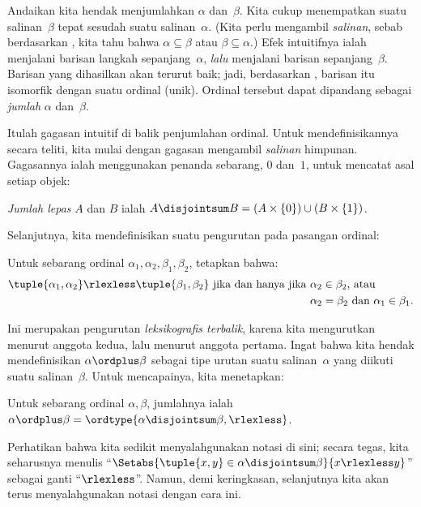 \documentclass[../../../include/open-logic-section]{subfiles}
\begin{document}

Andaikan kita hendak menjumlahkan $\alpha$ dan~$\beta$. Kita cukup
menempatkan suatu salinan~$\beta$ tepat sesudah suatu salinan~$\alpha$.
(Kita perlu mengambil \emph{salinan}, sebab berdasarkan
, kita tahu bahwa
$\alpha\subseteq\beta$ atau $\beta\subseteq\alpha$.) Efek intuitifnya ialah
menjalani barisan langkah sepanjang~$\alpha$, \emph{lalu} menjalani barisan
sepanjang~$\beta$. Barisan yang dihasilkan akan terurut baik; jadi, berdasarkan
, barisan itu isomorfik
dengan suatu ordinal (unik). Ordinal tersebut dapat dipandang sebagai
\emph{jumlah} $\alpha$ dan~$\beta$.

Itulah gagasan intuitif di balik penjumlahan ordinal. Untuk mendefinisikannya
secara teliti, kita mulai dengan gagasan mengambil \emph{salinan} himpunan.
Gagasannya ialah menggunakan penanda sebarang, $0$ dan~$1$, untuk mencatat
asal setiap objek:

\begin{defn}
\emph{Jumlah lepas} $A$ dan $B$ ialah
$A\disjointsum B=(A\times\{0\})\cup(B\times\{1\})$.
\end{defn}

Selanjutnya, kita mendefinisikan suatu pengurutan pada pasangan ordinal:

\begin{defn}
Untuk sebarang ordinal $\alpha_1,\alpha_2,\beta_1,\beta_2$, tetapkan bahwa:
\begin{align*}
	\tuple{\alpha_1, \alpha_2} \rlexless \tuple{\beta_1, \beta_2}\text{ jika dan hanya jika }& 
	\text{$\alpha_2 \in \beta_2$, atau}\\
	& \text{$\alpha_2 = \beta_2$ dan $\alpha_1 \in \beta_1$.}
\end{align*}
\end{defn}

Ini merupakan pengurutan \emph{leksikografis terbalik}, karena kita
mengurutkan menurut anggota kedua, lalu menurut anggota pertama. Ingat bahwa
kita hendak mendefinisikan $\alpha\ordplus\beta$ sebagai tipe urutan suatu
salinan~$\alpha$ yang diikuti suatu salinan~$\beta$. Untuk mencapainya, kita
menetapkan:

\begin{defn}
Untuk sebarang ordinal $\alpha,\beta$, jumlahnya ialah
$\alpha\ordplus\beta=\ordtype{\alpha\disjointsum\beta,\rlexless}$.
\end{defn}
\noindent
Perhatikan bahwa kita sedikit menyalahgunakan notasi di sini; secara tegas,
kita seharusnya menulis
``$\Setabs{\tuple{x,y}\in\alpha\disjointsum\beta}{x\rlexless y}$'' sebagai
ganti ``$\rlexless$''. Namun, demi keringkasan, selanjutnya kita akan terus
menyalahgunakan notasi dengan cara ini.
\end{document}
